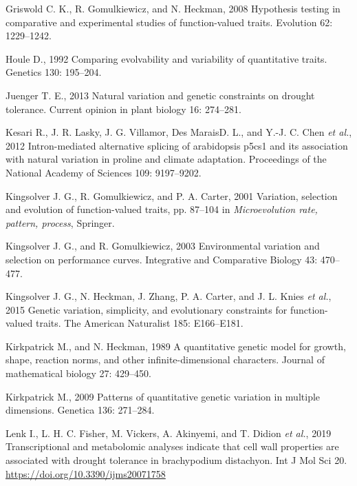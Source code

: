 \documentclass[jou,floatsintext]{apa6}
\begin{document}
\leavevmode\hypertarget{ref-griswold2008hypothesis}{}%
Griswold C. K., R. Gomulkiewicz, and N. Heckman, 2008 Hypothesis testing in comparative and experimental studies of function-valued traits. Evolution 62: 1229--1242.

\leavevmode\hypertarget{ref-houle1992comparing}{}%
Houle D., 1992 Comparing evolvability and variability of quantitative traits. Genetics 130: 195--204.

\leavevmode\hypertarget{ref-juenger2013natural}{}%
Juenger T. E., 2013 Natural variation and genetic constraints on drought tolerance. Current opinion in plant biology 16: 274--281.

\leavevmode\hypertarget{ref-kesari2012intron}{}%
Kesari R., J. R. Lasky, J. G. Villamor, Des MaraisD. L., and Y.-J. C. Chen \emph{et al.}, 2012 Intron-mediated alternative splicing of arabidopsis p5cs1 and its association with natural variation in proline and climate adaptation. Proceedings of the National Academy of Sciences 109: 9197--9202.

\leavevmode\hypertarget{ref-kingsolver2001variation}{}%
Kingsolver J. G., R. Gomulkiewicz, and P. A. Carter, 2001 Variation, selection and evolution of function-valued traits, pp. 87--104 in \emph{Microevolution rate, pattern, process}, Springer.

\leavevmode\hypertarget{ref-kingsolver2003environmental}{}%
Kingsolver J. G., and R. Gomulkiewicz, 2003 Environmental variation and selection on performance curves. Integrative and Comparative Biology 43: 470--477.

\leavevmode\hypertarget{ref-kingsolver2015genetic}{}%
Kingsolver J. G., N. Heckman, J. Zhang, P. A. Carter, and J. L. Knies \emph{et al.}, 2015 Genetic variation, simplicity, and evolutionary constraints for function-valued traits. The American Naturalist 185: E166--E181.

\leavevmode\hypertarget{ref-kirkpatrick1989quantitative}{}%
Kirkpatrick M., and N. Heckman, 1989 A quantitative genetic model for growth, shape, reaction norms, and other infinite-dimensional characters. Journal of mathematical biology 27: 429--450.

\leavevmode\hypertarget{ref-kirkpatrick2009patterns}{}%
Kirkpatrick M., 2009 Patterns of quantitative genetic variation in multiple dimensions. Genetica 136: 271--284.

\leavevmode\hypertarget{ref-lenk2019transcriptional}{}%
Lenk I., L. H. C. Fisher, M. Vickers, A. Akinyemi, and T. Didion \emph{et al.}, 2019 Transcriptional and metabolomic analyses indicate that cell wall properties are associated with drought tolerance in brachypodium distachyon. Int J Mol Sci 20. \url{https://doi.org/10.3390/ijms20071758}
\end{document}
